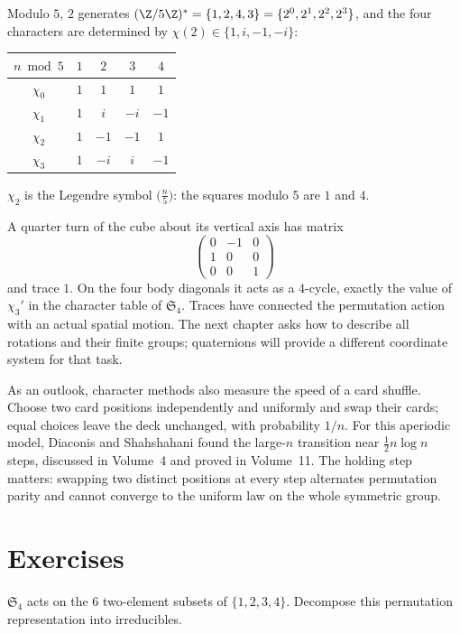 \begin{example}\label{ex:dir5}
Modulo $5$, $2$ generates $(\Z/5\Z)^*=\{1,2,4,3\}=\{2^0,2^1,2^2,2^3\}$, and the four characters are determined by $\chi(2)\in\{1,i,-1,-i\}$:
\begin{center}
\small
\begin{tabular}{c|cccc}
$n\bmod5$ & $1$ & $2$ & $3$ & $4$\\\hline
$\chi_0$ & $1$ & $1$ & $1$ & $1$\\
$\chi_1$ & $1$ & $i$ & $-i$ & $-1$\\
$\chi_2$ & $1$ & $-1$ & $-1$ & $1$\\
$\chi_3$ & $1$ & $-i$ & $i$ & $-1$
\end{tabular}
\end{center}
$\chi_2$ is the Legendre symbol $\bigl(\frac n5\bigr)$: the squares modulo $5$ are $1$ and $4$.
\end{example}

\begin{beauty}
A quarter turn of the cube about its vertical axis has matrix
\[
\begin{pmatrix}0&-1&0\\1&0&0\\0&0&1\end{pmatrix}
\]
and trace $1$. On the four body diagonals it acts as a $4$-cycle, exactly
the value of $\chi_3'$ in the character table of $\mathfrak S_4$.
Traces have connected the permutation action with an actual spatial motion.
The next chapter asks how to describe all rotations and their finite groups;
quaternions will provide a different coordinate system for that task.

As an outlook, character methods also measure the speed of a card shuffle.
Choose two card positions independently and uniformly and swap their cards;
equal choices leave the deck unchanged, with probability $1/n$.
For this aperiodic model, Diaconis and Shahshahani found the large-$n$
transition near $\tfrac12n\log n$ steps, discussed in Volume~4 and proved
in Volume~11. The holding step matters: swapping two distinct positions at
every step alternates permutation parity and cannot converge to the uniform
law on the whole symmetric group.
\end{beauty}

\section{Exercises}

\begin{exercise}[$\star$]\label{ex:pairs}
$\mathfrak S_4$ acts on the $6$ two-element subsets of $\{1,2,3,4\}$. Decompose this permutation representation into irreducibles.
\end{exercise}

